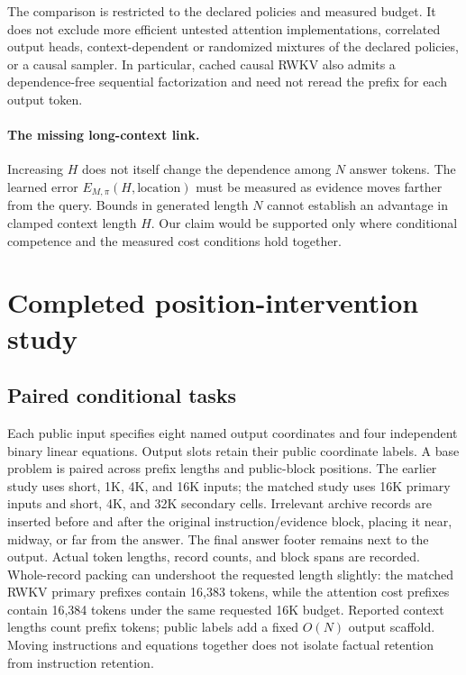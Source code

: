 \documentclass{article}
\begin{document}
The comparison is restricted to the declared policies and measured budget. It
does not exclude more efficient untested attention implementations, correlated
output heads, context-dependent or randomized mixtures of the declared
policies, or a causal sampler. In particular, cached causal RWKV also admits
a dependence-free sequential factorization and need not reread the prefix for
each output token.

\paragraph{The missing long-context link.}
Increasing $H$ does not itself change the dependence among $N$ answer tokens.
The learned error $E_{M,\pi}(H,\mathrm{location})$ must be measured as evidence
moves farther from the query. Bounds in generated length $N$ cannot establish
an advantage in clamped context length $H$. Our claim would be supported only
where conditional competence and the measured cost conditions hold together.

\section{Completed position-intervention study}\label{app:position-study}
\subsection{Paired conditional tasks}
Each public input specifies eight named output coordinates and four independent
binary linear equations. Output slots retain their public coordinate labels.
A base problem is paired across prefix lengths and public-block positions.
The earlier study uses short, 1K, 4K, and 16K inputs; the matched study uses
16K primary inputs and short, 4K, and 32K secondary cells. Irrelevant archive records are
inserted before and after the original instruction/evidence block, placing it
near, midway, or far from the answer. The final answer footer remains next to
the output. Actual token lengths, record counts, and block spans are recorded.
Whole-record packing can undershoot the requested length slightly: the
matched RWKV primary prefixes contain 16,383 tokens, while the attention
cost prefixes contain 16,384 tokens under the same requested 16K budget.
Reported context lengths count prefix tokens; public labels add a fixed
$O(N)$ output scaffold. Moving instructions and equations together does not
isolate factual retention from instruction retention.
\end{document}
